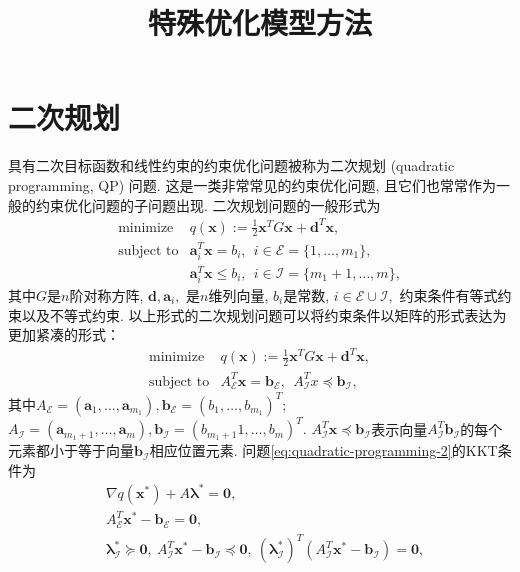 \documentclass{SBCbookchapter}
\author{}
\title{特殊优化模型方法}
\newcommand{\V}[1]{{\bm{#1}}}
\numberwithin{equation}{section}
\begin{document}
\maketitle


\section{二次规划}
\label{sec:7.2}

具有二次目标函数和线性约束的约束优化问题被称为二次规划 (quadratic programming, QP) 问题. 这是一类非常常见的约束优化问题, 且它们也常常作为一般的约束优化问题的子问题出现. 二次规划问题的一般形式为
\begin{equation}
\label{eq:quadratic-programming-1}
\begin{array}{cl}
\text{minimize} & q(\V{x}) := \frac{1}{2} \V{x}^T G \V{x} + \V{d}^T \V{x}, \\
\text{subject to} & \V{a}_i^T \V{x} = b_i, ~~ i \in \mathcal{E} = \{1, \ldots, m_1\}, \\
& \V{a}_i^T \V{x} \leqslant b_i, ~~ i \in \mathcal{I} = \{m_1 + 1, \ldots, m\},
\end{array}
\end{equation}
其中$G$是$n$阶对称方阵, $\V{d}, \V{a}_i,$ 是$n$维列向量, $b_i$是常数, $i \in \mathcal{E} \cup \mathcal{I},$ 约束条件有等式约束以及不等式约束. 以上形式的二次规划问题可以将约束条件以矩阵的形式表达为更加紧凑的形式：
\begin{equation}
\label{eq:quadratic-programming-2}
\begin{array}{cl}
\text{minimize} & q(\V{x}) := \frac{1}{2} \V{x}^T G \V{x} + \V{d}^T \V{x}, \\
\text{subject to} & A^T_{\mathcal{E}} \V{x} = \V{b}_{\mathcal{E}}, ~~ A^T_{\mathcal{I}} x \preccurlyeq \V{b}_{\mathcal{I}},
\end{array}
\end{equation}
其中$A_{\mathcal{E}} = (\V{a}_1, \ldots, \V{a}_{m_1}), \V{b}_{\mathcal{E}} = (b_1, \ldots, b_{m_1})^T;$ $A_{\mathcal{I}} = (\V{a}_{m_1+1}, \ldots, \V{a}_m), \V{b}_{\mathcal{I}} = (b_{m_1+1}1, \ldots, b_m)^T.$ $A^T_{\mathcal{I}} \V{x} \preccurlyeq \V{b}_{\mathcal{I}}$表示向量$A^T_{\mathcal{I}} \V{b}_{\mathcal{I}}$的每个元素都小于等于向量$\V{b}_{\mathcal{I}}$相应位置元素. 问题\eqref{eq:quadratic-programming-2}的KKT条件为
\begin{equation}
\label{eq:quadratic-programming-kkt}
\begin{aligned}
& \nabla q(\V{x}^*) + A \V{\lambda}^* = \V{0}, \\
& A^T_{\mathcal{E}} \V{x}^* - \V{b}_{\mathcal{E}} = \V{0}, \\
& \V{\lambda}^*_{\mathcal{I}} \succcurlyeq \V{0}, ~ A_{\mathcal{I}}^T \V{x}^* - \V{b}_{\mathcal{I}} \preccurlyeq \V{0}, ~ (\V{\lambda}^*_{\mathcal{I}})^T (A_{\mathcal{I}}^T \V{x}^* - \V{b}_{\mathcal{I}}) = \V{0},
\end{aligned}
\end{equation}
\end{document}

